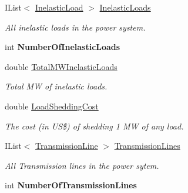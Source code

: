 \begin{DoxyCompactItemize}
\item 
I\+List$<$ \hyperlink{class_power_system_planning_1_1_inelastic_load}{Inelastic\+Load} $>$ \hyperlink{class_power_system_planning_1_1_power_system_a3785895f5e1d62105769d59f433979b1}{Inelastic\+Loads}
\begin{DoxyCompactList}\small\item\em All inelastic loads in the power system. \end{DoxyCompactList}\item 
int {\bfseries Number\+Of\+Inelastic\+Loads}\hypertarget{class_power_system_planning_1_1_power_system_a923796a156c2438a8a95bc34308732bc}{}\label{class_power_system_planning_1_1_power_system_a923796a156c2438a8a95bc34308732bc}

\item 
double \hyperlink{class_power_system_planning_1_1_power_system_ade5099d2eb198a61bf794e14ce4b3018}{Total\+M\+W\+Inelastic\+Loads}
\begin{DoxyCompactList}\small\item\em Total MW of inelastic loads. \end{DoxyCompactList}\item 
double \hyperlink{class_power_system_planning_1_1_power_system_a3f0729d4eaa155e4b8be848d84a1fbff}{Load\+Shedding\+Cost}
\begin{DoxyCompactList}\small\item\em The cost (in US\$) of shedding 1 MW of any load. \end{DoxyCompactList}\item 
I\+List$<$ \hyperlink{class_power_system_planning_1_1_transmission_line}{Transmission\+Line} $>$ \hyperlink{class_power_system_planning_1_1_power_system_a8b2c36218174e515b9ab0ef34531435f}{Transmission\+Lines}
\begin{DoxyCompactList}\small\item\em All Transmission lines in the power sytem. \end{DoxyCompactList}\item 
int {\bfseries Number\+Of\+Transmission\+Lines}\hypertarget{class_power_system_planning_1_1_power_system_aec138fa5496014f03d2511d62f19ce1f}{}\label{class_power_system_planning_1_1_power_system_aec138fa5496014f03d2511d62f19ce1f}


\end{DoxyCompactItemize}
